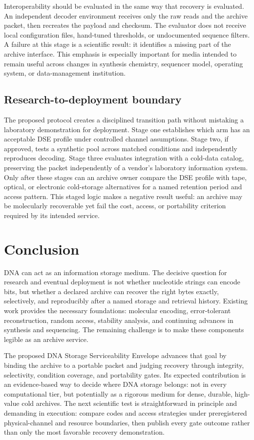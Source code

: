 \documentclass[conference]{IEEEtran}
\begin{document}
Interoperability should be evaluated in the same way that recovery is evaluated. An independent decoder environment receives only the raw reads and the archive packet, then recreates the payload and checksum. The evaluator does not receive local configuration files, hand-tuned thresholds, or undocumented sequence filters. A failure at this stage is a scientific result: it identifies a missing part of the archive interface. This emphasis is especially important for media intended to remain useful across changes in synthesis chemistry, sequencer model, operating system, or data-management institution.

\subsection{Research-to-deployment boundary}

The proposed protocol creates a disciplined transition path without mistaking a laboratory demonstration for deployment. Stage one establishes which arm has an acceptable DSE profile under controlled channel assumptions. Stage two, if approved, tests a synthetic pool across matched conditions and independently reproduces decoding. Stage three evaluates integration with a cold-data catalog, preserving the packet independently of a vendor's laboratory information system. Only after these stages can an archive owner compare the DSE profile with tape, optical, or electronic cold-storage alternatives for a named retention period and access pattern. This staged logic makes a negative result useful: an archive may be molecularly recoverable yet fail the cost, access, or portability criterion required by its intended service.

\section{Conclusion}

DNA can act as an information storage medium. The decisive question for research and eventual deployment is not whether nucleotide strings can encode bits, but whether a declared archive can recover the right bytes exactly, selectively, and reproducibly after a named storage and retrieval history. Existing work provides the necessary foundations: molecular encoding, error-tolerant reconstruction, random access, stability analysis, and continuing advances in synthesis and sequencing. The remaining challenge is to make these components legible as an archive service.

The proposed DNA Storage Serviceability Envelope advances that goal by binding the archive to a portable packet and judging recovery through integrity, selectivity, condition coverage, and portability gates. Its expected contribution is an evidence-based way to decide where DNA storage belongs: not in every computational tier, but potentially as a rigorous medium for dense, durable, high-value cold archives. The next scientific test is straightforward in principle and demanding in execution: compare codes and access strategies under preregistered physical-channel and resource boundaries, then publish every gate outcome rather than only the most favorable recovery demonstration.
\end{document}
